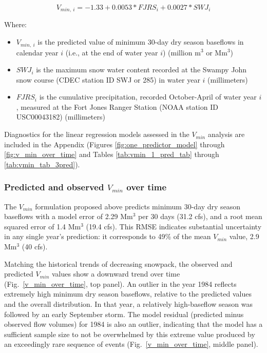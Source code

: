 \documentclass[hess, manuscript]{copernicus}
\providecommand{\tightlist}{%
  \setlength{\itemsep}{0pt}\setlength{\parskip}{0pt}}
\begin{document}
\begin{equation}
V_{min,~i} = -1.33 + 0.0053 * FJRS_{i}+0.0027*SWJ_{i}
\end{equation}

Where:

\begin{itemize}
\tightlist
\item
  $V_{min,~i}$ is the predicted value of minimum 30-day dry season
  baseflows in calendar year $i$ (i.e., at the end of water year
  $i$) (million m$^\mathrm{3}$ or Mm$^\mathrm{3}$)
\item
  $SWJ_{i}$ is the maximum snow water content recorded at the Swampy
  John snow course (CDEC station ID SWJ or 285) in water year $i$
  (millimeters)
\item
  $FJRS_{i}$ is the cumulative precipitation, recorded October-April
  of water year $i$, measured at the Fort Jones Ranger Station (NOAA
  station ID USC00043182) (millimeters)
\end{itemize}

Diagnostics for the linear regression models assessed in the $V_{min}$
analysis are included in the Appendix (Figures
\ref{fig:one_predictor_model} through \ref{fig:v_min_over_time} and
Tables \ref{tab:vmin_1_pred_tab} through \ref{tab:vmin_tab_3pred}).

\subsubsection{\texorpdfstring{Predicted and observed $V_{min}$ over
time}{Predicted and observed V\_\{min\} over time}}

The $V_{min}$ formulation proposed above predicts minimum 30-day dry
season baseflows with a model error of 2.29 Mm$^\mathrm{3}$ per 30
days (31.2 cfs), and a root mean squared error of 1.4
Mm$^\mathrm{3}$ (19.4 cfs). This RMSE indicates substantial
uncertainty in any single year's prediction: it corresponds to 49\% of
the mean $V_{min}$ value, 2.9 Mm$^\mathrm{3}$ (40 cfs).

Matching the historical trends of decreasing snowpack, the observed and
predicted $V_{min}$ values show a downward trend over time
(Fig.~\ref{v_min_over_time}, top panel). An outlier in the year 1984
reflects extremely high minimum dry season baseflows, relative to the
predicted values and the overall distribution. In that year, a
relatively high-baseflow season was followed by an early September
storm. The model residual (predicted minus observed flow volumes) for
1984 is also an outlier, indicating that the model has a sufficient
sample size to not be overwhelmed by this extreme value produced by an
exceedingly rare sequence of events (Fig.~\ref{v_min_over_time},
middle panel).
\end{document}
